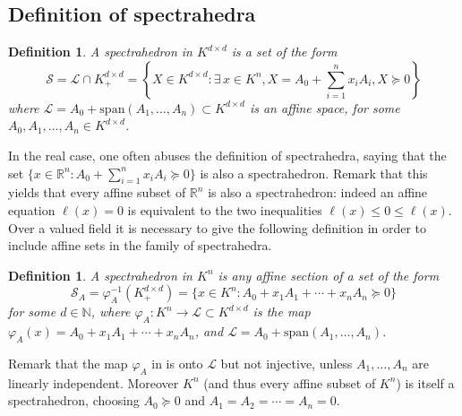 \documentclass[sigconf]{acmart}
\renewcommand{\span}[1]{{\mathrm{span}(#1)}} %
\newtheorem{definition}[theorem]{Definition}
\newtheorem{remark}[theorem]{Remark}
\newcommand{\OK}{\mathcal{O}_K}
\begin{document}



\subsection{Definition of spectrahedra}

\begin{definition}
  \label{def_spectrahedra}
  A \emph{spectrahedron in $K^{d\times d}$} is a set of the form
  $$
  \mathcal{S} = \mathcal{L} \cap K^{d\times d}_+ = \left\{X \in K^{d \times d} :
  \exists \, x \in K^n, X = A_0 + \sum_{i=1}^n x_i A_i, X \succeq 0\right\}
  $$
  where $\mathcal{L} = A_0+\span{A_1,\ldots,A_n} \subset K^{d \times d}$ is an affine space, for some
  $A_0,A_1,\ldots,A_n \in K^{d\times d}$.
\end{definition}

In the real case, one often abuses the definition of spectrahedra, saying that the set
$\{x \in \mathbb{R}^n : A_0+\sum_{i=1}^n x_iA_i \succeq 0\}$ is also a spectrahedron.
Remark that this yields that every affine subset of $\mathbb{R}^n$ is also
a spectrahedron: indeed an affine equation $\ell(x) = 0$ is equivalent to the two inequalities
$\ell(x) \leq 0 \leq \ell(x)$. Over a valued field it is necessary to give the following
definition in order to include affine sets in the family of spectrahedra.

\begin{definition}
  \label{def_spectrahedra_Kn}
  A \emph{spectrahedron in $K^n$} is any affine section of a set of the form
  $$
  \mathcal{S}_A = \varphi_A^{-1}(K^{d \times d}_+) = \{x \in K^n : A_0+x_1A_1+\cdots+x_nA_n \succeq 0\}
  $$
  for some $d\in \mathbb{N}$,
  where $\varphi_A : K^n \to \mathcal{L} \subset K^{d \times d}$ is the map
  $\varphi_A(x) = A_0+x_1A_1+\cdots+x_nA_n$, and $\mathcal{L} = A_0+\span{A_1,\ldots,A_n}$.
\end{definition}

Remark that the map $\varphi_A$ in  is onto $\mathcal{L}$ but not
injective, unless $A_1,\ldots,A_n$ are linearly independent. Moreover $K^n$ (and thus every affine
subset of $K^n$) is itself a spectrahedron, choosing $A_0 \succeq 0$ and $A_1=A_2=\cdots=A_n=0$.
\end{document}
